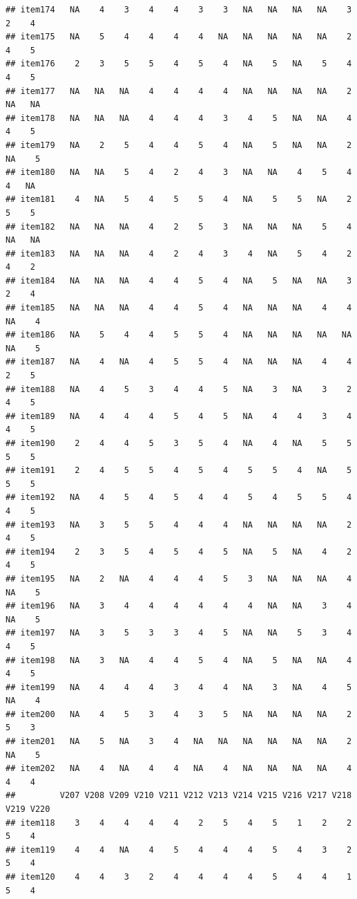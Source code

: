 \documentclass[
  man]{apa6}
\begin{document}
\begin{verbatim}
## item174   NA    4    3    4    4    3    3   NA   NA   NA   NA    3    2    4
## item175   NA    5    4    4    4    4   NA   NA   NA   NA   NA    2    4    5
## item176    2    3    5    5    4    5    4   NA    5   NA    5    4    4    5
## item177   NA   NA   NA    4    4    4    4   NA   NA   NA   NA    2   NA   NA
## item178   NA   NA   NA    4    4    4    3    4    5   NA   NA    4    4    5
## item179   NA    2    5    4    4    5    4   NA    5   NA   NA    2   NA    5
## item180   NA   NA    5    4    2    4    3   NA   NA    4    5    4    4   NA
## item181    4   NA    5    4    5    5    4   NA    5    5   NA    2    5    5
## item182   NA   NA   NA    4    2    5    3   NA   NA   NA    5    4   NA   NA
## item183   NA   NA   NA    4    2    4    3    4   NA    5    4    2    4    2
## item184   NA   NA   NA    4    4    5    4   NA    5   NA   NA    3    2    4
## item185   NA   NA   NA    4    4    5    4   NA   NA   NA    4    4   NA    4
## item186   NA    5    4    4    5    5    4   NA   NA   NA   NA   NA   NA    5
## item187   NA    4   NA    4    5    5    4   NA   NA   NA    4    4    2    5
## item188   NA    4    5    3    4    4    5   NA    3   NA    3    2    4    5
## item189   NA    4    4    4    5    4    5   NA    4    4    3    4    4    5
## item190    2    4    4    5    3    5    4   NA    4   NA    5    5    5    5
## item191    2    4    5    5    4    5    4    5    5    4   NA    5    5    5
## item192   NA    4    5    4    5    4    4    5    4    5    5    4    4    5
## item193   NA    3    5    5    4    4    4   NA   NA   NA   NA    2    4    5
## item194    2    3    5    4    5    4    5   NA    5   NA    4    2    4    5
## item195   NA    2   NA    4    4    4    5    3   NA   NA   NA    4   NA    5
## item196   NA    3    4    4    4    4    4    4   NA   NA    3    4   NA    5
## item197   NA    3    5    3    3    4    5   NA   NA    5    3    4    4    5
## item198   NA    3   NA    4    4    5    4   NA    5   NA   NA    4    4    5
## item199   NA    4    4    4    3    4    4   NA    3   NA    4    5   NA    4
## item200   NA    4    5    3    4    3    5   NA   NA   NA   NA    2    5    3
## item201   NA    5   NA    3    4   NA   NA   NA   NA   NA   NA    2   NA    5
## item202   NA    4   NA    4    4   NA    4   NA   NA   NA   NA    4    4    4
##         V207 V208 V209 V210 V211 V212 V213 V214 V215 V216 V217 V218 V219 V220
## item118    3    4    4    4    4    2    5    4    5    1    2    2    5    4
## item119    4    4   NA    4    5    4    4    4    5    4    3    2    5    4
## item120    4    4    3    2    4    4    4    4    5    4    4    1    5    4

\end{verbatim}
\end{document}
